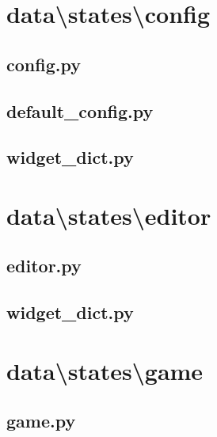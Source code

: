 \documentclass[../main/main.tex]{subfiles}
\begin{document}
\section{data\textbackslash states\textbackslash config}
\subsection{config.py}

\label{src:data/states/config/config.py}

\subsection{default\_config.py}

\label{src:data/states/config/default_config.py}

\subsection{widget\_dict.py}

\label{src:data/states/config/widget_dict.py}

\section{data\textbackslash states\textbackslash editor}
\subsection{editor.py}

\label{src:data/states/editor/editor.py}

\subsection{widget\_dict.py}

\label{src:data/states/editor/widget_dict.py}

\section{data\textbackslash states\textbackslash game}
\subsection{game.py}

\label{src:data/states/game/game.py}
\end{document}
